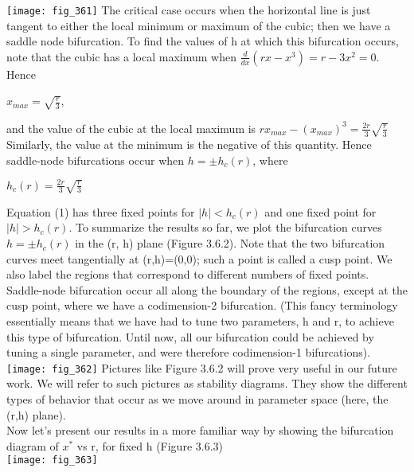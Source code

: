 \documentclass{article}
\newcommand\tab[1][1cm]{\hspace*{#1}}
\begin{document}
\texttt{[image: fig\_361]}
\tab The critical case occurs when the horizontal line is just tangent to either the local minimum or maximum of the cubic; then we have a saddle node bifurcation. To find the values of h at which this bifurcation occurs, note that the cubic has a local maximum when $\frac{d}{dx}(rx-x^{3})=r-3x^{2}=0$. Hence
\begin{center}
$x_{max}=\sqrt{\frac{r}{3}}$,
\end{center}
and the value of the cubic at the local maximum is 
$rx_{max}-(x_{max})^{3}= \frac{2r}{3}{\sqrt{\frac{r}{3}}}$ \\
Similarly, the value at the minimum is the negative of this quantity. Hence saddle-node bifurcations occur when $h=\pm h_{c}(r)$, where
\begin{center}
$h_{c}(r)=\frac{2r}{3}\sqrt{\frac{r}{3}}$
\end{center} 
Equation (1) has three fixed points for $|h|<h_{c}(r)$ and one fixed point for $|h|>h_{c}(r)$. To summarize the results so far, we plot the bifurcation curves $h=\pm h_{c}(r)$ in the (r, h) plane (Figure 3.6.2). Note that the two bifurcation curves meet tangentially at (r,h)=(0,0); such a point is called a cusp point. We also label the regions that correspond to different numbers of fixed points. Saddle-node bifurcation occur all along the boundary of the regions, except at the cusp point, where we have a codimension-2 bifurcation. (This fancy terminology essentially means that we have had to tune two parameters, h and r, to achieve this type of bifurcation. Until now, all our bifurcation could be achieved by tuning a single parameter, and were therefore codimension-1 bifurcations).
\texttt{[image: fig\_362]}
Pictures like Figure 3.6.2 will prove very useful in our future work. We will refer to such pictures as stability diagrams. They show the different types of behavior that occur as we move around in parameter space (here, the (r,h) plane). \\ \tab
Now let's present our results in a more familiar way by showing the bifurcation diagram of $x^{*}$ vs r, for fixed h (Figure 3.6.3)
\\
\texttt{[image: fig\_363]}
\end{document}
